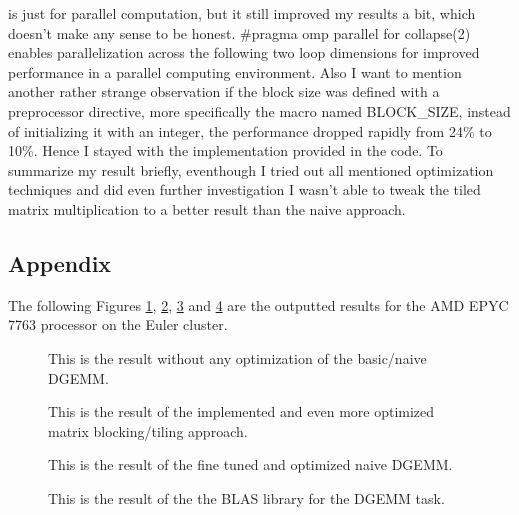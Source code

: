 \documentclass[unicode,11pt,a4paper,oneside,numbers=endperiod,openany]{scrartcl}
\begin{document}
is just for parallel computation, but it still improved my results a bit, which doesn't make any sense to be honest. \#pragma omp parallel for collapse(2)
enables parallelization across the following two loop dimensions for improved performance in a parallel computing environment. Also I want to mention 
another rather strange observation if the block size was defined with a preprocessor directive, more specifically the macro named BLOCK\_SIZE, instead of
initializing it with an integer, the performance dropped rapidly from 24\% to 10\%. Hence I stayed with the implementation provided in the code.
\newline
To summarize my result briefly, eventhough I tried out all mentioned optimization techniques and did even further investigation I wasn't able 
to tweak the tiled matrix multiplication to a better result than the naive approach.

\newpage
\subsection{Appendix}%
The following Figures \ref{fig:basic}, \ref{fig:blocked}, \ref{fig:best} and \ref{fig:blas} are the outputted results for the AMD 
EPYC 7763 processor on the Euler cluster.

\begin{figure}[H]
    \centering
    {\fontsize{8}{10}\selectfont
    }
    \caption{This is the result without any optimization of the basic/naive DGEMM.}
    \label{fig:basic}
\end{figure}

\begin{figure}[H]
    \centering
    {\fontsize{8}{10}\selectfont
    }
    \caption{This is the result of the implemented and even more optimized matrix blocking/tiling approach.}
    \label{fig:blocked}
\end{figure}

\begin{figure}[H]
    \centering
    {\fontsize{8}{10}\selectfont
    }
    \caption{This is the result of the fine tuned and optimized naive DGEMM.}
    \label{fig:best}
\end{figure}

\begin{figure}[H]
    \centering
    {\fontsize{8}{10}\selectfont
    }
    \caption{This is the result of the the BLAS library for the DGEMM task.}
    \label{fig:blas}
\end{figure}

\newpage



\end{document}

